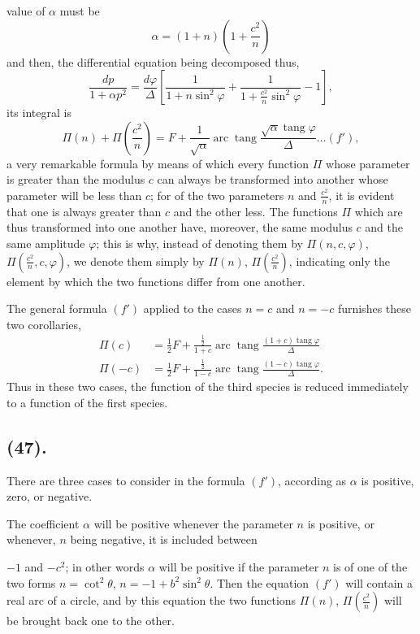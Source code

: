 \documentclass{article}
\begin{document}
value of $\alpha$ must be
\[ \alpha=(1+n)\left(1+\frac{c^{2}}{n}\right) \]
and then, the differential equation being decomposed thus,
\[ \frac{dp}{1+\alpha p^{2}}=\frac{d\varphi}{\Delta}\left[\frac{1}{1+n\sin^{2}\varphi}+\frac{1}{1+\frac{c^{2}}{n}\sin^{2}\varphi}-1\right], \]
its integral is
\[ \Pi(n)+\Pi\left(\frac{c^{2}}{n}\right)=F+\frac{1}{\sqrt{\alpha}}\operatorname{arc}\operatorname{tang}\frac{\sqrt{\alpha}\operatorname{tang}\varphi}{\Delta}\ldots(f'), \]
a very remarkable formula by means of which every function $\Pi$ whose parameter is greater than the modulus $c$ can always be transformed into another whose parameter will be less than $c$; for of the two parameters $n$ and $\frac{c^{2}}{n}$, it is evident that one is always greater than $c$ and the other less. The functions $\Pi$ which are thus transformed into one another have, moreover, the same modulus $c$ and the same amplitude $\varphi$; this is why, instead of denoting them by $\Pi(n,c,\varphi)$, $\Pi\left(\frac{c^{2}}{n},c,\varphi\right)$, we denote them simply by $\Pi(n)$, $\Pi\left(\frac{c^{2}}{n}\right)$, indicating only the element by which the two functions differ from one another.

The general formula $(f')$ applied to the cases $n=c$ and $n=-c$ furnishes these two corollaries,
\[ \begin{aligned} \Pi(c)&=\tfrac{1}{2}F+\frac{\frac{1}{2}}{1+c}\operatorname{arc}\operatorname{tang}\frac{(1+c)\operatorname{tang}\varphi}{\Delta}\\ \Pi(-c)&=\tfrac{1}{2}F+\frac{\frac{1}{2}}{1-c}\operatorname{arc}\operatorname{tang}\frac{(1-c)\operatorname{tang}\varphi}{\Delta}. \end{aligned} \]
Thus in these two cases, the function of the third species is reduced immediately to a function of the first species.

\subsection*{(47).}

There are three cases to consider in the formula $(f')$, according as $\alpha$ is positive, zero, or negative.

The coefficient $\alpha$ will be positive whenever the parameter $n$ is positive, or whenever, $n$ being negative, it is included between

$-1$ and $-c^{2}$; in other words $\alpha$ will be positive if the parameter $n$ is of one of the two forms $n=\cot^{2}\theta$, $n=-1+b^{2}\sin^{2}\theta$. Then the equation $(f')$ will contain a real arc of a circle, and by this equation the two functions $\Pi(n)$, $\Pi\left(\frac{c^{2}}{n}\right)$ will be brought back one to the other.
\end{document}
